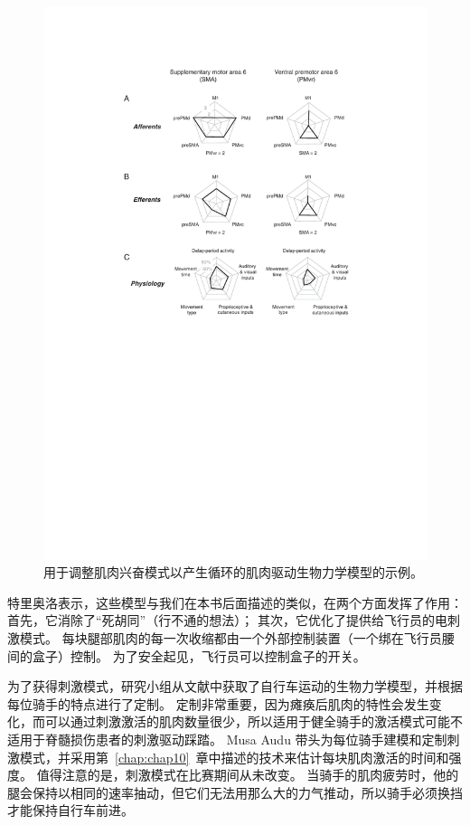 \begin{figure}[!htb]
	\centering
	\includegraphics[width=1.0\linewidth]{chap1/1_9}
	\caption{用于调整肌肉兴奋模式以产生循环的肌肉驱动生物力学模型的示例。 \label{fig:1_9}}
\end{figure}


特里奥洛表示，这些模型与我们在本书后面描述的类似，在两个方面发挥了作用：
首先，它消除了“死胡同”（行不通的想法）；
其次，它优化了提供给飞行员的电刺激模式。
每块腿部肌肉的每一次收缩都由一个外部控制装置（一个绑在飞行员腰间的盒子）控制。
为了安全起见，飞行员可以控制盒子的开关。


为了获得刺激模式，研究小组从文献中获取了自行车运动的生物力学模型，并根据每位骑手的特点进行了定制。
定制非常重要，因为瘫痪后肌肉的特性会发生变化，而可以通过刺激激活的肌肉数量很少，所以适用于健全骑手的激活模式可能不适用于脊髓损伤患者的刺激驱动踩踏。
Musa Audu 带头为每位骑手建模和定制刺激模式，并采用第~\ref{chap:chap10}~章中描述的技术来估计每块肌肉激活的时间和强度。
值得注意的是，刺激模式在比赛期间从未改变。
当骑手的肌肉疲劳时，他的腿会保持以相同的速率抽动，但它们无法用那么大的力气推动，所以骑手必须换挡才能保持自行车前进。


